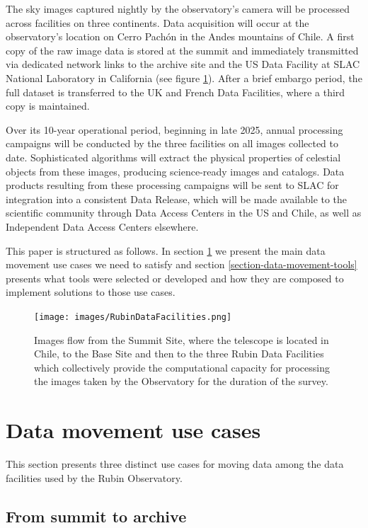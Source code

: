 \documentclass{webofc}
\begin{document}
The sky images captured nightly by the observatory's camera will be processed across facilities on three continents. Data acquisition will occur at the observatory's location on Cerro Pachón in the Andes mountains of Chile. A first copy of the raw image data is stored at the summit and immediately transmitted via dedicated network links to the archive site and the US Data Facility at SLAC National Laboratory in California (see figure \ref{fig:data-facilities}). After a brief embargo period, the full dataset is transferred to the UK and French Data Facilities, where a third copy is maintained.

Over its 10-year operational period, beginning in late 2025, annual processing campaigns will be conducted by the three facilities on all images collected to date. Sophisticated algorithms will extract the physical properties of celestial objects from these images, producing science-ready images and catalogs. Data products resulting from these processing campaigns will be sent to SLAC for integration into a consistent Data Release, which will be made available to the scientific community through Data Access Centers in the US and Chile, as well as Independent Data Access Centers elsewhere.

This paper is structured as follows. In section \ref{section-data-movement-use-cases} we present the main data movement use cases we need to satisfy and section \ref{section-data-movement-tools} presents what tools were selected or developed and how they are composed to implement solutions to those use cases.

\begin{figure}[h]
\texttt{[image: images/RubinDataFacilities.png]}
\caption{Images flow from the Summit Site, where the telescope is located in Chile, to the Base Site and then to the three Rubin Data Facilities which collectively provide the computational capacity for processing the images taken by the Observatory for the duration of the survey.}
\label{fig:data-facilities}
\end{figure}

\section{Data movement use cases}
\label{section-data-movement-use-cases}

This section presents three distinct use cases for moving data among the data facilities used by the Rubin Observatory.

\subsection{From summit to archive}
\label{summit-to-archive}
\end{document}
